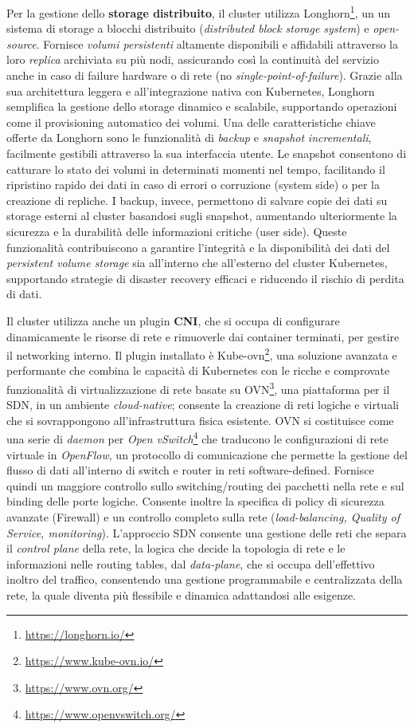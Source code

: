 Per la gestione dello \textbf{storage distribuito}, il cluster utilizza Longhorn\footnote{\url{https://longhorn.io/}}, un un sistema di storage a blocchi distribuito (\textit{distributed block storage system}) e \textit{open-source}.
Fornisce \emph{volumi persistenti} altamente disponibili e affidabili attraverso la loro \emph{replica} archiviata su più nodi, assicurando così la continuità del servizio anche in caso di failure hardware o di rete (no \textit{single-point-of-failure}).
Grazie alla sua architettura leggera e all'integrazione nativa con Kubernetes, Longhorn semplifica la gestione dello storage dinamico e scalabile, supportando operazioni come il provisioning automatico dei volumi.
Una delle caratteristiche chiave offerte da Longhorn sono le funzionalità di \emph{backup} e \emph{snapshot} \emph{incrementali}, facilmente gestibili attraverso la sua interfaccia utente.
Le snapshot consentono di catturare lo stato dei volumi in determinati momenti nel tempo, facilitando il ripristino rapido dei dati in caso di errori o corruzione (system side) o per la creazione di repliche.
I backup, invece, permettono di salvare copie dei dati su storage esterni al cluster basandosi sugli snapshot, aumentando ulteriormente la sicurezza e la durabilità delle informazioni critiche (user side).
Queste funzionalità contribuiscono a garantire l'integrità e la disponibilità dei dati del \textit{persistent volume storage} sia all'interno che all'esterno del cluster Kubernetes, supportando strategie di disaster recovery efficaci e riducendo il rischio di perdita di dati.

Il cluster utilizza anche un plugin \textbf{\gls{CNI}}, che si occupa di configurare dinamicamente le risorse di rete e rimuoverle dai container terminati, per gestire il networking interno.
Il plugin installato è Kube-ovn\footnote{\url{https://www.kube-ovn.io/}}, una soluzione avanzata e performante che combina le capacità di Kubernetes con le ricche e comprovate funzionalità di virtualizzazione di rete basate su \gls{OVN}\footnote{\url{https://www.ovn.org/}}, una piattaforma per il \gls{SDN}, in un ambiente \textit{cloud-native}; consente la creazione di reti logiche e virtuali che si sovrappongono all'infrastruttura fisica esistente.
\gls{OVN} si costituisce come una serie di \textit{daemon} per \textit{Open vSwitch}\footnote{\url{https://www.openvswitch.org/}} che traducono le configurazioni di rete virtuale in \textit{OpenFlow}, un protocollo di comunicazione che permette la gestione del flusso di dati all'interno di switch e router in reti software-defined.
Fornisce quindi un maggiore controllo sullo switching/routing dei pacchetti nella rete e sul binding delle porte logiche. Consente inoltre la specifica di policy di sicurezza avanzate (Firewall) e un controllo completo sulla rete (\textit{load-balancing, Quality of Service, monitoring}).
L'approccio \gls{SDN} consente una gestione delle reti che separa il \textit{control plane} della rete, la logica che decide la topologia di rete e le informazioni nelle routing tables, dal \textit{data-plane}, che si occupa dell'effettivo inoltro del traffico, consentendo una gestione programmabile e centralizzata della rete, la quale diventa più flessibile e dinamica adattandosi alle esigenze.


